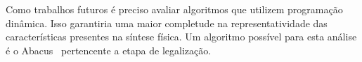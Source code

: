Como trabalhos futuros é preciso avaliar algoritmos que utilizem programação dinâmica.
Isso garantiria uma maior completude na representatividade das características presentes na síntese física.
Um algoritmo possível para esta análise é o Abacus~\cite{spindler2008abacus} pertencente a etapa de legalização.
